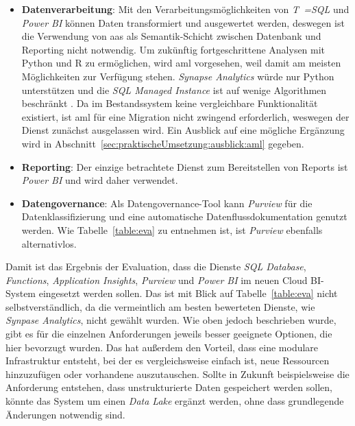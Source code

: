 \begin{itemize}
\item \textbf{Datenverarbeitung}: Mit den Verarbeitungsmöglichkeiten von \textit{T~=SQL} und \textit{Power BI} können Daten transformiert und ausgewertet werden, deswegen ist die Verwendung von \ac{aas} als Semantik-Schicht zwischen Datenbank und Reporting nicht notwendig. Um zukünftig fortgeschrittene Analysen mit Python und R zu ermöglichen, wird \ac{aml} vorgesehen, weil damit am meisten Möglichkeiten zur Verfügung stehen. \textit{Synapse Analytics} würde nur Python unterstützen und die \textit{SQL Managed Instance} ist auf wenige Algorithmen beschränkt \cite{etaati_introduction_2019}.
Da im Bestandssystem keine vergleichbare Funktionalität existiert, ist \ac{aml} für eine Migration nicht zwingend erforderlich, weswegen der Dienst zunächst ausgelassen wird. Ein Ausblick auf eine mögliche Ergänzung wird in Abschnitt~\ref{sec:praktischeUmsetzung:ausblick:aml} gegeben.
\item \textbf{Reporting}: Der einzige betrachtete Dienst zum Bereitstellen von Reports ist \textit{Power BI} und wird daher verwendet.
\item \textbf{Datengovernance}: Als Datengovernance-Tool kann \textit{Purview} für die Datenklassifizierung und eine automatische Datenflussdokumentation genutzt werden. Wie Tabelle~\ref{table:eva} zu entnehmen ist, ist \textit{Purview} ebenfalls alternativlos.
\end{itemize}
 
 Damit ist das Ergebnis der Evaluation, dass die Dienste \textit{SQL Database}, \textit{Functions}, \textit{Application Insights}, \textit{Purview} und \textit{Power BI} im neuen Cloud BI-System eingesetzt werden sollen. Das ist mit Blick auf Tabelle~\ref{table:eva} nicht selbstverständlich, da die vermeintlich am besten bewerteten Dienste, wie \textit{Synpase Analytics}, nicht gewählt wurden. Wie oben jedoch beschrieben wurde, gibt es für die einzelnen Anforderungen jeweils besser geeignete Optionen, die hier bevorzugt wurden. Das hat außerdem den Vorteil, dass eine modulare Infrastruktur entsteht, bei der es vergleichsweise einfach ist, neue Ressourcen hinzuzufügen oder vorhandene auszutauschen. Sollte in Zukunft beispielsweise die Anforderung entstehen, dass unstrukturierte Daten gespeichert werden sollen, könnte das System um einen \textit{Data Lake} ergänzt werden, ohne dass grundlegende Änderungen notwendig sind.




